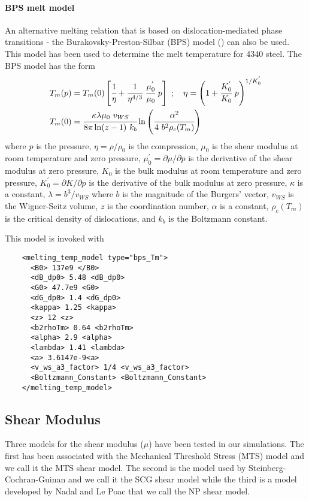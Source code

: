   \paragraph{BPS melt model}
  An alternative melting relation that is based on dislocation-mediated
  phase transitions - the Burakovsky-Preston-Silbar (BPS) model
  (\cite{Burakovsky2000}) can also be used.  This model has been used to 
  determine the melt temperature for 4340 steel.  The BPS model has the form
  \begin{align}
    T_m(p) & = T_m(0)
      \left[\cfrac{1}{\eta} + 
            \cfrac{1}{\eta^{4/3}}~\cfrac{\mu_0^{'}}{\mu_0}~p\right]~; 
    \quad
    \eta = \left(1 + \cfrac{K_0^{'}}{K_0}~p\right)^{1/K_0^{'}} 
    \label{eq:TmBPS}\\
    T_m(0) & = \cfrac{\kappa\lambda\mu_0~v_{WS}}{8\pi\ln(z-1)~k_b}
               \ln\left(\cfrac{\alpha^2}{4~b^2\rho_c(T_m)}\right)
  \end{align}
  where $p$ is the pressure, $\eta = \rho/\rho_0$ is the compression, 
  $\mu_0$ is the shear modulus at room temperature and zero pressure, 
  $\mu_0^{'} = \partial\mu/\partial p$ is the derivative of the shear modulus 
  at zero pressure, $K_0$ is the bulk modulus at room temperature and
  zero pressure, $K_0^{'} = \partial K/\partial p$ is the derivative of the 
  bulk modulus at zero pressure, $\kappa$ is a constant, $\lambda = b^3/v_{WS}$
  where $b$ is the magnitude of the Burgers' vector, $v_{WS}$ is the 
  Wigner-Seitz volume, $z$ is the coordination number, $\alpha$ is a 
  constant, $\rho_c(T_m)$ is the critical density of dislocations, and
  $k_b$ is the Boltzmann constant.

  This model is invoked with
  \lstset{language=XML}
  \begin{lstlisting}
    <melting_temp_model type="bps_Tm">
      <B0> 137e9 </B0>
      <dB_dp0> 5.48 <dB_dp0>
      <G0> 47.7e9 <G0>
      <dG_dp0> 1.4 <dG_dp0>
      <kappa> 1.25 <kappa>
      <z> 12 <z>
      <b2rhoTm> 0.64 <b2rhoTm>
      <alpha> 2.9 <alpha>
      <lambda> 1.41 <lambda>
      <a> 3.6147e-9<a>
      <v_ws_a3_factor> 1/4 <v_ws_a3_factor>
      <Boltzmann_Constant> <Boltzmann_Constant>
    </melting_temp_model>
  \end{lstlisting}

  \subsection{Shear Modulus} \label{sec:ModelShear}
  Three models for the shear modulus ($\mu$) have been tested in our 
  simulations.  The first has been associated with the Mechanical 
  Threshold Stress (MTS) model and we call it the MTS shear model.
  The second is the model used by Steinberg-Cochran-Guinan and we call
  it the SCG shear model while the third is a model developed by 
  Nadal and Le Poac that we call the NP shear model.

